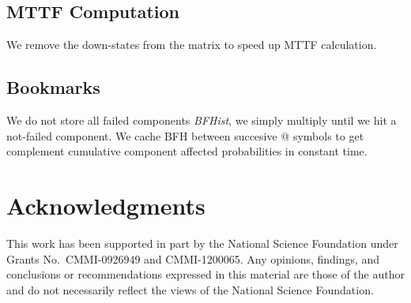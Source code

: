 \documentclass[12pt]{article}
\newcommand{\varName}[1]{\textrm{\it#1}}
\begin{document}
\subsection{MTTF Computation}
We remove the down-states from the matrix to speed up MTTF calculation.

\subsection{Bookmarks}
We do not store all failed components \varName{BFHist}, we simply multiply
until we hit a not-failed component. We cache BFH between succesive @  symbols
to get complement cumulative component affected probabilities in constant
time.


\section*{Acknowledgments}

This work has been supported
in part by
the National Science Foundation under
Grants No.\
CMMI-0926949
and CMMI-1200065.
Any opinions, findings, and conclusions or recommendations
expressed in this material are those of the author and
do not necessarily reflect the views of the National
Science Foundation.




\end{document}
